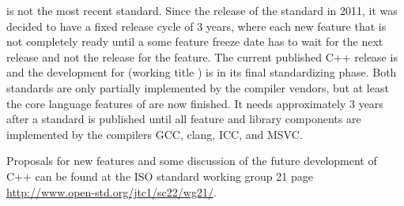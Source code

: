  is not the most recent standard. Since the release of the  standard in 2011, it was decided to have a fixed release cycle of 3 years,
where each new feature that is not completely ready until a some feature freeze date has to wait for the next release and not the release for the feature.
The current published C++ release is  and the development for  (working title ) is in its
final standardizing phase. Both standards are only partially implemented by the compiler vendors, but at least the core language features
of  are now finished. It needs approximately 3 years after a standard is published until all feature and library components are
implemented by the compilers GCC, clang, ICC, and MSVC.

Proposals for new features and some discussion of the future development of C++ can be found at the ISO standard working group 21 page
\url{http://www.open-std.org/jtc1/sc22/wg21/}.
